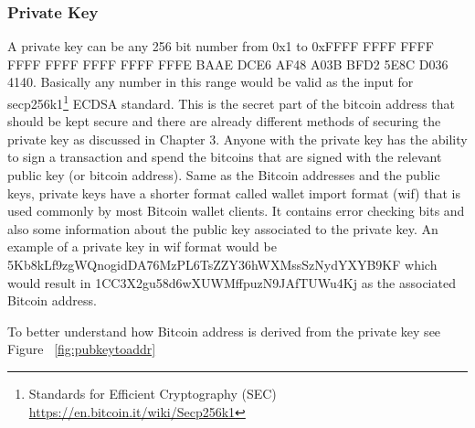 \subsubsection{Private Key}
A private key can be any 256 bit number from 0x1 to 0xFFFF FFFF FFFF FFFF FFFF FFFF FFFF FFFE BAAE DCE6 AF48 A03B BFD2 5E8C D036 4140. Basically any number in this range would be valid as the input for secp256k1\footnote{Standards for Efficient Cryptography (SEC) \url{https://en.bitcoin.it/wiki/Secp256k1}} ECDSA standard. This is the secret part of the bitcoin address that should be kept secure and there are already different methods of securing the private key as discussed in Chapter 3. Anyone with the private key has the ability to sign a transaction and spend the bitcoins that are signed with the relevant public key (or bitcoin address). 
Same as the Bitcoin addresses and the public keys, private keys have a shorter format called wallet import format (wif) that is used commonly by most Bitcoin wallet clients. It contains error checking bits and also some information about the public key associated to the private key. An example of a private key in wif format would be 5Kb8kLf9zgWQnogidDA76MzPL6TsZZY36hWXMssSzNydYXYB9KF which would result in 1CC3X2gu58d6wXUWMffpuzN9JAfTUWu4Kj as the associated Bitcoin address.

To better understand how Bitcoin address is derived from the private key see Figure  ~\ref{fig:pubkeytoaddr}

